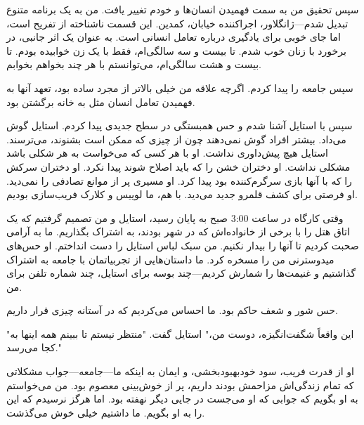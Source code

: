 سپس تحقیق من به سمت فهمیدن انسان‌ها و خودم تغییر یافت. من به یک برنامه متنوع تبدیل شدم—ژانگلاور، اجراکننده خیابان، کمدین. این قسمت ناشناخته از تفریح است، اما جای خوبی برای یادگیری درباره تعامل انسانی است. به عنوان یک اثر جانبی، در برخورد با زنان خوب شدم. تا بیست و سه سالگی‌ام، فقط با یک زن خوابیده بودم. تا بیست و هشت سالگی‌ام، می‌توانستم با هر چند بخواهم بخوابم.

سپس جامعه را پیدا کردم. اگرچه علاقه من خیلی بالاتر از مجرد ساده بود، تعهد آنها به فهمیدن تعامل انسان مثل به خانه برگشتن بود.

سپس با استایل آشنا شدم و حس همبستگی در سطح جدیدی پیدا کردم. استایل گوش می‌داد. بیشتر افراد گوش نمی‌دهند چون از چیزی که ممکن است بشنوند، می‌ترسند. استایل هیچ پیش‌داوری نداشت. او با هر کسی که می‌خواست به هر شکلی باشد مشکلی نداشت. او دختران خشن را که باید اصلاح شوند پیدا نکرد. او دختران سرکش را که با آنها بازی سرگرم‌کننده بود پیدا کرد. او مسیری پر از موانع تصادفی را نمی‌دید. او فرصتی برای کشف قلمرو جدید می‌دید. با هم، ما لوییس و کلارک فریب‌سازی بودیم.

وقتی کارگاه در ساعت 3:00 صبح به پایان رسید، استایل و من تصمیم گرفتیم که یک اتاق هتل را با برخی از خانواده‌اش که در شهر بودند، به اشتراک بگذاریم. ما به آرامی صحبت کردیم تا آنها را بیدار نکنیم. من سبک لباس استایل را دست انداختم. او حس‌های میدوسترنی من را مسخره کرد. ما داستان‌هایی از تجربیاتمان با جامعه به اشتراک گذاشتیم و غنیمت‌ها را شمارش کردیم—چند بوسه برای استایل، چند شماره تلفن برای من.

حس شور و شعف حاکم بود. ما احساس می‌کردیم که در آستانه چیزی قرار داریم.

"این واقعاً شگفت‌انگیزه، دوست من،" استایل گفت. "منتظر نیستم تا ببینم همه اینها به کجا می‌رسد."

او از قدرت فریب، سود خودبهبودبخشی، و ایمان به اینکه ما—جامعه—جواب مشکلاتی که تمام زندگی‌اش مزاحمش بودند داریم، پر از خوش‌بینی معصوم بود. من می‌خواستم به او بگویم که جوابی که او می‌جست در جایی دیگر نهفته بود. اما هرگز نرسیدم که این را به او بگویم. ما داشتیم خیلی خوش می‌گذشت.